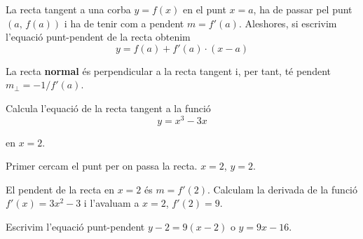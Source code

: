 \begin{theorybox}
	La recta tangent a una corba $y=f(x)$ en el punt $x=a$, ha de passar pel punt $(a,\, f(a))$ i ha de tenir com a pendent $m=f'(a)$. Aleshores, si escrivim l'equació punt-pendent
	de la recta obtenim
	\begin{equation*}
	y=f(a)+f'(a)\cdot (x-a)
	\end{equation*}
	
	La recta \textbf{normal} és perpendicular a la recta tangent i, per tant, té pendent $m_\bot=-1/f'(a)$.
\end{theorybox}

 
\begin{resolt}[E]{Calcula l'equació de la  recta tangent a la funció \[y = x^3 - 3x\] \par en $x = 2$.}
	Primer cercam el punt per on passa la recta. $x=2$, $y=2$. \vspace{0.25cm}
	
	El pendent de la recta en $x=2$ és $m=f'(2)$. Calculam la derivada de la funció $f'(x)=3x^2-3$ i l'avaluam a $x=2$,
	$f'(2)=9$. \vspace{0.25cm}
	
	Escrivim l'equació punt-pendent $y-2=9(x-2)$ o $y=9x-16$.
\end{resolt}

